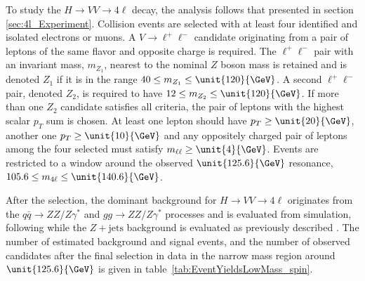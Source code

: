 To study the $H \to VV \to 4\ell$ decay, the analysis follows that presented in section \ref{sec:4l_Experiment}. Collision events are selected with at least four identified and isolated electrons or muons. A $V \to \ell^+\ell^-$ candidate originating from a pair of leptons of the same flavor and opposite charge is required. The $\ell^+\ell^-$ pair with an invariant mass, $m_{Z_1}$, nearest to the nominal $Z$ boson mass is retained
and is denoted $Z_{1}$ if it is in the range $40 \le m_{Z_1} \le \unit{120}{\GeV}$.
A second $\ell^{+}\ell^{-}$ pair, denoted $Z_{2}$, is required to have $12 \le m_{Z_2} \le \unit{120}{\GeV}$.
If more than one $Z_{2}$ candidate satisfies all criteria, the pair of
leptons with the highest scalar $p_{T}$ sum is chosen.
At least one lepton should have $p_{T} \ge \unit{20}{\GeV}$, another one
$p_{T} \ge \unit{10}{\GeV}$ and any oppositely charged pair of leptons among the four selected must satisfy
$m_{\ell\ell} \ge \unit{4}{\GeV}$. Events are restricted to a window around the observed
$\unit{125.6}{\GeV}$ resonance, $105.6 \le m_{4\ell} \le \unit{140.6}{\GeV}$.

After the selection, the dominant background for $H \to VV \to 4\ell$ originates from the
$q\bar{q} \to ZZ/Z\gamma^*$ and $gg \to ZZ/Z\gamma^*$ processes
and is evaluated from simulation, following \cite{Chatrchyan:2013mxa}
while the $Z + \text{jets}$ background is evaluated as previously described \cite{Chatrchyan:2013mxa}. The number of estimated background and signal events, and the number of
observed candidates after the final selection in data in the
narrow mass region around $\unit{125.6}{\GeV}$  is given in table~\ref{tab:EventYieldsLowMass_spin}.

